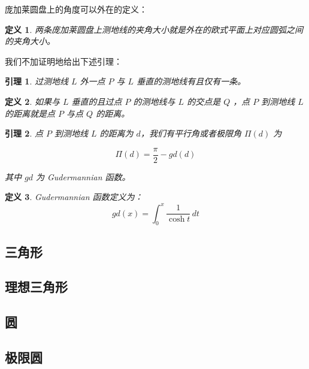 \documentclass[a4paper,12pt]{article}
\newtheorem{definition}{定义}
\newtheorem{lemma}{引理}
\begin{document}
庞加莱圆盘上的角度可以外在的定义：

\begin{definition}
\label{d3}
两条庞加莱圆盘上测地线的夹角大小就是外在的欧式平面上对应圆弧之间的夹角大小。
\end{definition}

我们不加证明地给出下述引理：

\begin{lemma}
\label{l2}
过测地线 $L$ 外一点 $P$ 与 $L$ 垂直的测地线有且仅有一条。
\end{lemma}

\begin{definition}
\label{d4}
如果与 $L$ 垂直的且过点 $P$ 的测地线与 $L$ 的交点是 $Q$ ，点 $P$ 到测地线 $L$ 的距离就是点 $P$ 与点 $Q$ 的距离。
\end{definition}

\begin{lemma}
\label{l3}
点 $P$ 到测地线 $L$ 的距离为 $d$，我们有平行角或者极限角 $ \Pi(d) $ 为

$$ \Pi(d) = \frac{\pi}{2} - gd(d) $$

其中 $gd$ 为 Gudermannian 函数。
\end{lemma}

\begin{definition}
\label{d5}
Gudermannian 函数定义为：
$$ gd(x) = \int_0^x \frac{1}{\cosh t} \, dt $$
\end{definition}

\newpage

\subsection{三角形}

\newpage

\subsection{理想三角形}

\newpage

\subsection{圆}

\newpage

\subsection{极限圆}

\newpage
\end{document}

